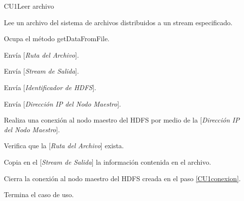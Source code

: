 \begin{UseCase}{CU1}{Leer archivo}{

	Lee un archivo del sistema de archivos distribuidos a un stream especificado.

}















\end{UseCase}


\begin{UCtrayectoria}

	\UCpaso[\UCactor] Ocupa el método getDataFromFile.

	\UCpaso[\UCactor] Envía [{\em Ruta del Archivo}].

	\UCpaso[\UCactor] Envía [{\em Stream de Salida}].

	\UCpaso[\UCactor] Envía [{\em Identificador de HDFS}].

	\UCpaso[\UCactor] Envía [{\em Dirección IP del Nodo Maestro}].

	\UCpaso[\UCsist] Realiza una conexión al nodo maestro del HDFS por medio de la [{\em Dirección IP del Nodo Maestro}].\label{CU1conexion}

	\UCpaso[\UCsist] Verifica que la [{\em Ruta del Archivo}] exista. 

	\UCpaso[\UCsist] Copia en el [{\em Stream de Salida}] la información contenida en el archivo. 

	\UCpaso[\UCsist] Cierra la conexión al nodo maestro del HDFS creada en el paso \ref{CU1conexion}.

	\UCpaso[] Termina el caso de uso.

\end{UCtrayectoria}


